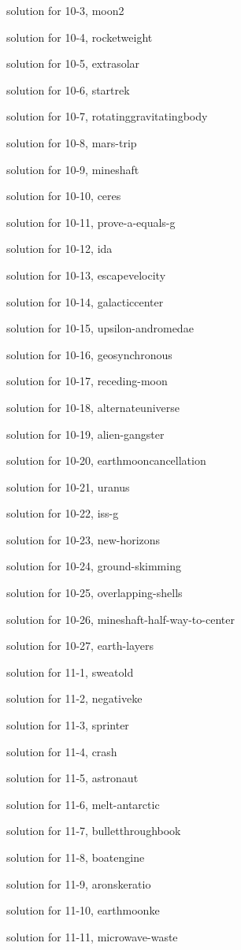 \documentclass{problems}
\begin{document}
solution for 10-3, moon2

solution for 10-4, rocketweight

solution for 10-5, extrasolar

solution for 10-6, startrek

solution for 10-7, rotatinggravitatingbody

solution for 10-8, mars-trip

solution for 10-9, mineshaft

solution for 10-10, ceres

solution for 10-11, prove-a-equals-g

solution for 10-12, ida

solution for 10-13, escapevelocity

solution for 10-14, galacticcenter

solution for 10-15, upsilon-andromedae

solution for 10-16, geosynchronous

solution for 10-17, receding-moon

solution for 10-18, alternateuniverse

solution for 10-19, alien-gangster

solution for 10-20, earthmooncancellation

solution for 10-21, uranus

solution for 10-22, iss-g

solution for 10-23, new-horizons

solution for 10-24, ground-skimming

solution for 10-25, overlapping-shells

solution for 10-26, mineshaft-half-way-to-center

solution for 10-27, earth-layers

solution for 11-1, sweatold

solution for 11-2, negativeke

solution for 11-3, sprinter

solution for 11-4, crash

solution for 11-5, astronaut

solution for 11-6, melt-antarctic

solution for 11-7, bulletthroughbook

solution for 11-8, boatengine

solution for 11-9, aronskeratio

solution for 11-10, earthmoonke

solution for 11-11, microwave-waste
\end{document}
